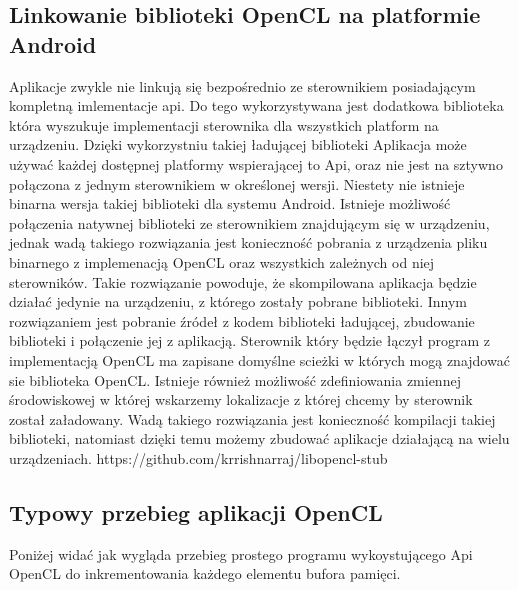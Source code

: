 \subsection{Linkowanie biblioteki OpenCL na platformie Android}
Aplikacje zwykle nie linkują się bezpośrednio ze sterownikiem posiadającym kompletną imlementacje api. Do tego wykorzystywana jest dodatkowa biblioteka która wyszukuje implementacji sterownika dla wszystkich platform na urządzeniu. Dzięki wykorzystniu takiej ładującej biblioteki Aplikacja może używać każdej dostępnej platformy wspierającej to Api, oraz nie jest na sztywno połączona z jednym sterownikiem w określonej wersji.
Niestety nie istnieje binarna wersja takiej biblioteki dla systemu Android. Istnieje możliwość połączenia natywnej biblioteki ze sterownikiem znajdującym się w urządzeniu, jednak wadą takiego rozwiązania jest konieczność pobrania z urządzenia pliku binarnego z implemenacją OpenCL oraz wszystkich zależnych od niej sterowników. Takie rozwiązanie powoduje, że skompilowana aplikacja będzie działać jedynie na urządzeniu, z którego zostały pobrane biblioteki.
Innym rozwiązaniem jest pobranie źródeł z kodem biblioteki ładującej, zbudowanie biblioteki i połączenie jej z aplikacją. Sterownik który będzie łączył program z implementacją OpenCL ma zapisane domyślne scieżki w których mogą znajdować sie biblioteka OpenCL. Istnieje również możliwość zdefiniowania zmiennej środowiskowej w której wskarzemy lokalizacje z której chcemy by sterownik został załadowany. Wadą takiego rozwiązania jest konieczność kompilacji takiej biblioteki, natomiast dzięki temu możemy zbudować aplikacje działającą na wielu urządzeniach.
https://github.com/krrishnarraj/libopencl-stub

\subsection{Typowy przebieg aplikacji OpenCL}
Poniżej widać jak wygląda przebieg prostego programu wykoystującego Api OpenCL do inkrementowania każdego elementu bufora pamięci.



